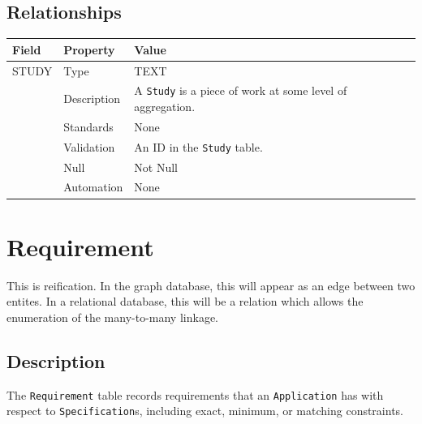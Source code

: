 \documentclass[
]{article}
\newcounter{none}
\begin{document}
\subsection{Relationships}\label{relationships-22}

{\def\LTcaptype{none} 
\begin{longtable}[]{@{}
  >{\raggedright\arraybackslash}p{}
  >{\raggedright\arraybackslash}p{}
  >{\raggedright\arraybackslash}p{}@{}}
\toprule\noalign{}
\begin{minipage}[b]{\linewidth}\raggedright
Field
\end{minipage} & \begin{minipage}[b]{\linewidth}\raggedright
Property
\end{minipage} & \begin{minipage}[b]{\linewidth}\raggedright
Value
\end{minipage} \\
\midrule\noalign{}
\endhead
\bottomrule\noalign{}
\endlastfoot
STUDY & Type & TEXT \\
& Description & A \texttt{Study} is a piece of work at some level of
aggregation. \\
& Standards & None \\
& Validation & An ID in the \texttt{Study} table. \\
& Null & Not Null \\
& Automation & None \\
\end{longtable}
}

\section{Requirement}\label{requirement}

This is reification. In the graph database, this will appear as an edge
between two entites. In a relational database, this will be a relation
which allows the enumeration of the many-to-many linkage.

\subsection{Description}\label{description-26}

The \texttt{Requirement} table records requirements that an
\texttt{Application} has with respect to \texttt{Specification}s,
including exact, minimum, or matching constraints.
\end{document}

